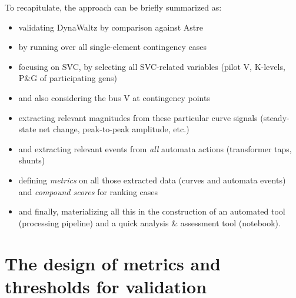 \documentclass[11pt, a4paper, twoside, titlepage]{article}
\begin{document}
To recapitulate, the approach can be briefly summarized as:
\begin{itemize}
\item validating DynaWaltz by comparison against Astre
\item by running over all single-element contingency cases
\item focusing on SVC, by selecting all SVC-related variables (pilot
  V, K-levels, P\&G of participating gens)
\item and also considering the bus V at contingency points
\item extracting relevant magnitudes from these particular curve
  signals (steady-state net change, peak-to-peak amplitude, etc.)
\item and extracting relevant events from \emph{all} automata actions
  (transformer taps, shunts)
\item defining \emph{metrics} on all those extracted data (curves and
  automata events) and \emph{compound scores} for ranking cases
\item and finally, materializing all this in the construction of an
  automated tool (processing pipeline) and a quick analysis \&
  assessment tool (notebook).
\end{itemize}




\section{The design of metrics and thresholds for validation}
\label{sec:metrics}
\end{document}
